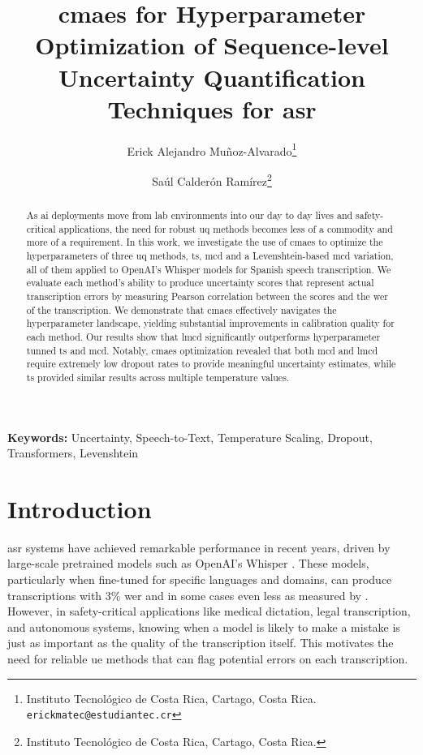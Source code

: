 \documentclass[11pt]{article}
\begin{document}
\title{\acrshort{cmaes} for Hyperparameter Optimization of Sequence-level Uncertainty Quantification Techniques for \acrshort{asr}}

\author{
    Erick Alejandro Muñoz-Alvarado\thanks{Instituto Tecnológico de Costa Rica, Cartago, Costa Rica. \texttt{erickmatec@estudiantec.cr}}
    \and
    Saúl Calderón Ramírez\thanks{Instituto Tecnológico de Costa Rica, Cartago, Costa Rica.}
}

\date{}

\maketitle

\begin{abstract}
    As \acrshort{ai} deployments move from lab environments into our day to day lives and safety-critical applications, the need for robust \acrshort{uq} methods becomes less of a commodity and more of a requirement. In this work, we investigate the use of \acrfull{cmaes} to optimize the hyperparameters of three \acrshort{uq} methods, \acrfull{ts}, \acrfull{mcd} and a Levenshtein-based \acrshort{mcd} variation, all of them applied to OpenAI's Whisper models for Spanish speech transcription. We evaluate each method's ability to produce uncertainty scores that represent actual transcription errors by measuring Pearson correlation between the scores and the \acrlong{wer} of the transcription. We demonstrate that \acrshort{cmaes} effectively navigates the hyperparameter landscape, yielding substantial improvements in calibration quality for each method. Our results show that \acrfull{lmcd} significantly outperforms hyperparameter tunned \acrshort{ts} and \acrshort{mcd}. Notably, \acrshort{cmaes} optimization revealed that both \acrshort{mcd} and \acrshort{lmcd} require extremely low dropout rates to provide meaningful uncertainty estimates, while \acrshort{ts} provided similar results across multiple temperature values.
\end{abstract}

\noindent\textbf{Keywords:} Uncertainty, Speech-to-Text, Temperature Scaling, Dropout, Transformers, Levenshtein

\listoftodos
\section{Introduction}

\acrfull{asr} systems have achieved remarkable performance in recent years, driven by large-scale pretrained models such as OpenAI's Whisper \cite{radford2023robust}. These models, particularly when fine-tuned for specific languages and domains, can produce transcriptions with 3\% \acrfull{wer} and in some cases even less as measured by \cite{srivastav2025open}. However, in safety-critical applications like medical dictation, legal transcription, and autonomous systems, knowing when a model is likely to make a mistake is just as important as the quality of the transcription itself\cite{koenecke2024careless}. This motivates the need for reliable \acrfull{ue} methods that can flag potential errors on each transcription.
\end{document}
